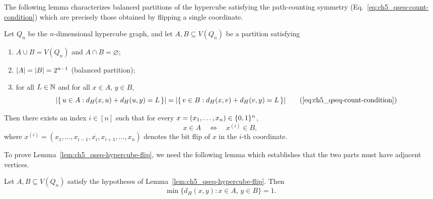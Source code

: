 \vspace{0.2cm}
\noindent
The following lemma characterizes balanced partitions of the hypercube satisfying the path-counting symmetry (Eq.~\eqref{eq:ch5_qseq-count-condition}) which are precisely those obtained by flipping a single coordinate.%
\begin{hypercubefliprestate}
    Let $Q_n$ be the $n$-dimensional hypercube graph, and let
    $A,B\subseteq V(Q_n)$ be a partition satisfying
    \begin{enumerate}[label=(\roman*)]
        \item $A\cup B=V(Q_n)$ and $A\cap B=\varnothing$;
        \item $\abs{A}=\abs{B}=2^{n-1}$ (balanced partition);
        \item for all $L\in\mathbb{N}$ and for all $x\in A$, $y\in B$,
        \begin{equation*}
            \abs{\{\,u\in A:
                d_H(x,u)+d_H(u,y)=L\,\}}
            =
            \abs{\{\,v\in B:
                d_H(x,v)+d_H(v,y)=L\,\}}
            \tag{\ref*{eq:ch5_qseq-count-condition}}
        \end{equation*}
    \end{enumerate}
    Then there exists an index $i\in[n]$ such that for every
    $x=(x_1,\ldots,x_n)\in\{ 0, 1 \}^n$,
    \[
        x\in A
        \quad\Longleftrightarrow\quad
        x^{(i)}\in B,
    \]
    where
    $x^{(i)}
    =(x_1,\ldots,x_{i-1},\overline{x_i},x_{i+1},\ldots,x_n)$
    denotes the bit flip of $x$ in the $i$-th coordinate.
\end{hypercubefliprestate}

To prove Lemma~\ref{lem:ch5_qseq-hypercube-flip}, we need the following lemma which establishes that the two parts must have adjacent vertices.

\begin{lemma}\label{lem:ch5_qseq-min-dist}
    Let $A, B \subseteq V(Q_n)$ satisfy the hypotheses of Lemma~\ref{lem:ch5_qseq-hypercube-flip}.
    Then
    \begin{equation}
        \min\{d_H(x, y) : x \in A, \, y \in B\} = 1.
    \end{equation}
\end{lemma}

